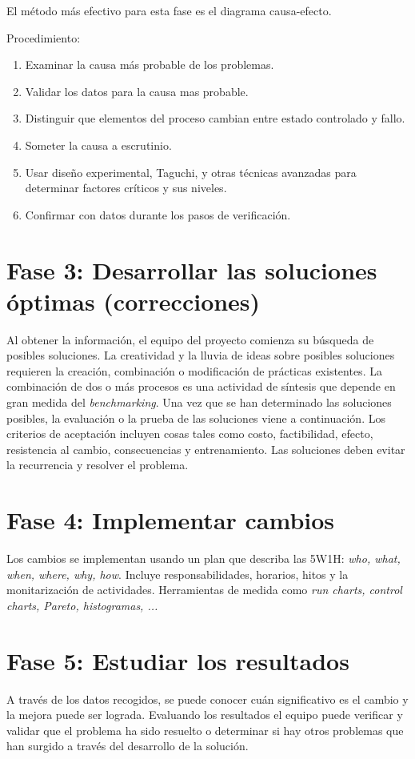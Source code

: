 \documentclass[oneside]{book}
\begin{document}
El método más efectivo para esta fase es el diagrama causa-efecto.

Procedimiento:
\begin{enumerate}
	\item Examinar la causa más probable de los problemas.
	\item Validar los datos para la causa mas probable.
	\item Distinguir que elementos del proceso cambian entre estado controlado y fallo.
	\item Someter la causa a escrutinio.
	\item Usar diseño experimental, Taguchi, y otras técnicas avanzadas para determinar factores críticos y sus niveles.
	\item Confirmar con datos durante los pasos de verificación.
\end{enumerate}

\section{Fase 3: Desarrollar las soluciones óptimas (correcciones)}
Al obtener la información, el equipo del proyecto comienza su búsqueda de posibles soluciones. La creatividad y la lluvia de ideas sobre posibles soluciones requieren la creación, combinación o modificación de prácticas existentes. La combinación de dos o más procesos es una actividad de síntesis que depende en gran medida del \textit{benchmarking}.
Una vez que se han determinado las soluciones posibles, la evaluación o la prueba de las soluciones viene a continuación. Los criterios de aceptación incluyen cosas tales como costo, factibilidad, efecto, resistencia al cambio, consecuencias y entrenamiento. Las soluciones deben evitar la recurrencia y resolver el problema.

\section{Fase 4: Implementar cambios}
Los cambios se implementan usando un plan que describa las 5W1H: \textit{who, what, when, where, why, how}. Incluye responsabilidades, horarios, hitos y la monitarización de actividades. Herramientas de medida como \textit{run charts, control charts, Pareto, histogramas, ...}

\section{Fase 5: Estudiar los resultados}
A través de los datos recogidos, se puede conocer cuán significativo es el cambio y la mejora puede ser lograda. Evaluando los resultados el equipo puede verificar y validar que el problema ha sido resuelto o determinar si hay otros problemas que han surgido a través del desarrollo de la solución.
\end{document}
